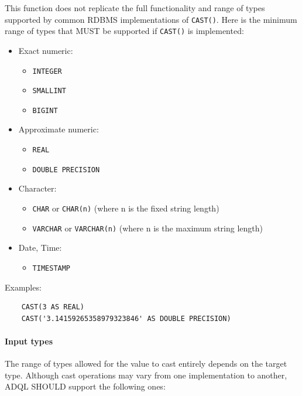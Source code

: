 \documentclass[11pt,a4paper]{ivoa}
\begin{document}
This function does not replicate the full functionality and range of types
supported by common RDBMS implementations of \verb:CAST():. Here is the minimum
range of types that MUST be supported if \verb:CAST(): is implemented:

\begin{itemize}
    \item Exact numeric:
    \begin{itemize}
        \item \verb:INTEGER:
        \item \verb:SMALLINT:
        \item \verb:BIGINT:
    \end{itemize}
    \item Approximate numeric:
    \begin{itemize}
        \item \verb:REAL:
        \item \verb:DOUBLE PRECISION:
    \end{itemize}
    \item Character:
    \begin{itemize}
        \item \verb:CHAR: or \verb:CHAR(n): (where n is the fixed string length)
        \item \verb:VARCHAR: or \verb:VARCHAR(n): (where n is the maximum string length)
    \end{itemize}
    \item Date, Time:
    \begin{itemize}
        \item \verb:TIMESTAMP:
    \end{itemize}
\end{itemize}

Examples:

\begin{verbatim}
    CAST(3 AS REAL)
    CAST('3.14159265358979323846' AS DOUBLE PRECISION)
\end{verbatim}

\paragraph{Input types}

The range of types allowed for the value to cast entirely depends on the target
type. Although cast operations may vary from one implementation to another, ADQL
SHOULD support the following ones:
\end{document}
